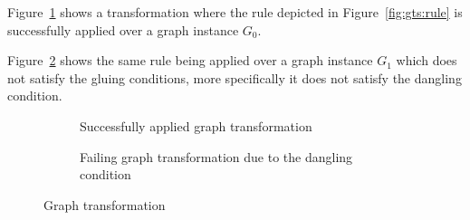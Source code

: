 \begin{example} Figure~\ref{fig:gts:transformation-success} shows a transformation where the rule depicted in Figure~\ref{fig:gts:rule} is successfully applied over a graph instance $G_0$.

  Figure~\ref{fig:gts:transformation-fail} shows the same rule being applied over a graph instance $G_1$ which does not satisfy the gluing conditions, more specifically it does not satisfy the dangling condition.

\begin{figure}[!ht]
  \centering
  \begin{subfigure}[t]{.5\textwidth}
    \centerline{}
    \caption{Successfully applied graph transformation}\label{fig:gts:transformation-success}
  \end{subfigure}

  \begin{subfigure}[t]{.5\textwidth}
    \centerline{}
    \caption{Failing graph transformation due to the dangling condition}\label{fig:gts:transformation-fail}
  \end{subfigure}
  \caption{Graph transformation}\label{fig:gts:transformation}
\end{figure}
\end{example}

